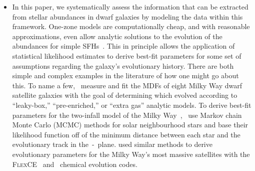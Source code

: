 \documentclass[ms.tex]{subfiles}
\begin{document}
\begin{itemize}


	\item In this paper, we systematically assess the information that can be
	extracted from stellar abundances in dwarf galaxies by modeling the data
	within this framework.
	One-zone models are computationally cheap, and with reasonable
	approximations, even allow analytic solutions to the evolution of the
	abundances for simple SFHs~\citep*[e.g.][]{Weinberg2017}.
	This in principle allows the application of statistical likelihood
	estimates to derive best-fit parameters for some set of assumptions
	regarding the galaxy's evolutionary history.
	There are both simple and complex examples in the literature of how one
	might go about this.
	To name a few,~\citet{Kirby2011} measure and fit the MDFs of eight Milky
	Way dwarf satellite galaxies with the goal of determining which evolved
	according to ``leaky-box,'' ``pre-enriched,'' or ``extra gas'' analytic
	models.
	To derive best-fit parameters for the two-infall model of the Milky
	Way~\citep[e.g.][]{Chiappini1997},~\citet{Spitoni2020} use Markov chain
	Monte Carlo (MCMC) methods for solar neighbourhood stars and base their
	likelihood function off of the minimum distance between each star and the
	evolutionary track in the~\afe-\feh~plane.
	\citet{Hasselquist2021} used similar methods to derive evolutionary
	parameters for the Milky Way's most massive satellites with the
	\textsc{FlexCE}~\citep{Andrews2017} and~\citet{Lian2018, Lian2020} chemical
	evolution codes.


\end{itemize}
\end{document}
